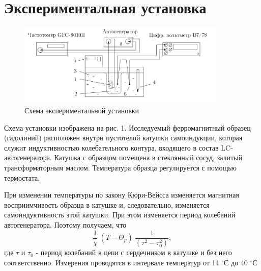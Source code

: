 \documentclass[a4paper]{article}
\begin{document}
\section{Экспериментальная установка}

\begin{figure}[h]
    \centering
    \includegraphics[width=10cm]{fig1.PNG}
    \caption{Схема экспериментальной установки}
    \label{fig:vac}
\end{figure}

Схема установки изображена на рис. 1. Исследуемый ферромагнитный образец (гадолиний) расположен внутри пустотелой катушки самоиндукции, которая служит индуктивностью колебательного контура, входящего в состав LC-автогенератора. Катушка с образцом помещена в стеклянный сосуд, залитый трансформаторным маслом. Температура образца регулируется с помощью термостата.  \par
При изменении температуры по закону Кюри-Вейсса изменяется магнитная восприимчивость образца в катушке и, следовательно, изменяется самоиндуктивность этой катушки. При этом изменяется период колебаний автогенератора. Поэтому получаем, что 
\begin{equation}
    \frac{1}{\chi} ~ (T - \Theta_p) ~ \frac{1}{(\tau^2 - \tau_0^2)},
\end{equation}
где $\tau$ и $\tau_0$ - период колебаний в цепи с сердечником в катушке и без него соответственно. Измерения проводятся в интервале температур от 14 $^{\circ}$С до 40 $^{\circ}$С
\end{document}
